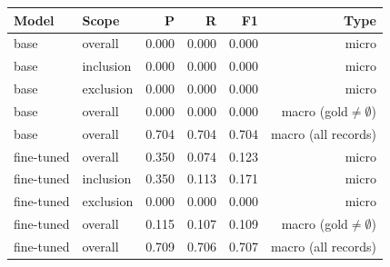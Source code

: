 \begin{tabular}{llrrrr}\toprule
Model & Scope & P & R & F1 & Type \\\midrule
base & overall & 0.000 & 0.000 & 0.000 & micro \\
base & inclusion & 0.000 & 0.000 & 0.000 & micro \\
base & exclusion & 0.000 & 0.000 & 0.000 & micro \\
base & overall & 0.000 & 0.000 & 0.000 & macro (gold$\neq\emptyset$) \\
base & overall & 0.704 & 0.704 & 0.704 & macro (all records) \\\midrule
fine-tuned & overall & 0.350 & 0.074 & 0.123 & micro \\
fine-tuned & inclusion & 0.350 & 0.113 & 0.171 & micro \\
fine-tuned & exclusion & 0.000 & 0.000 & 0.000 & micro \\
fine-tuned & overall & 0.115 & 0.107 & 0.109 & macro (gold$\neq\emptyset$) \\
fine-tuned & overall & 0.709 & 0.706 & 0.707 & macro (all records) \\\bottomrule\end{tabular}
